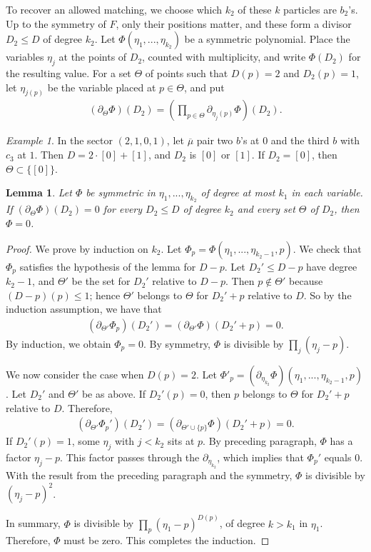 \documentclass[11pt]{amsart}
\newtheorem{lemma}[theorem]{Lemma}
\theoremstyle{definition}
\theoremstyle{remark}
\newtheorem{example}[theorem]{Example}
\begin{document}
To recover an allowed matching, we choose which $k_2$ of these $k$ particles are $b_2$'s. Up to the symmetry of $F$, only their positions matter, and these form a divisor $D_2\leq D$ of degree $k_2$. Let $\Phi(\eta_1,...,\eta_{k_2})$ be a symmetric polynomial. Place the variables $\eta_j$ at the points of $D_2$, counted with multiplicity, and write $\Phi(D_2)$ for the resulting value. For a set $\Theta$ of points such that $D(p)=2$ and $D_2(p)=1$, let $\eta_{j(p)}$ be the variable placed at $p\in \Theta$, and put
\begin{align*}
	(\partial_{\Theta}\Phi)(D_2)=\left(\prod_{p\in \Theta} \partial_{\eta_j(p)}\Phi\right)(D_2).	
\end{align*}
\begin{example}
	In the sector $(2,1,0,1)$, let $\overline{\mu}$ pair two $b$'s at 0 and the third $b$ with $c_3$ at $1$. Then $D=2\cdot [0]+[1]$, and $D_2$ is $[0]$ or $[1]$. If $D_2=[0]$, then $\Theta\subset\{[0] \} $.	
\end{example}
\begin{lemma}\label{lem:Phi}
	Let $\Phi$ be symmetric in $\eta_1,...,\eta_{k_2}$ of degree at most  $k_1$ in each variable. If $(\partial_{\Theta}\Phi)(D_2)=0$ for every $D_2\leq D$ of degree $k_2$ and every set $\Theta$ of $D_2$, then $\Phi=0$.
\end{lemma}
\begin{proof}
	We prove by induction on $k_2$. Let $\Phi_p=\Phi(\eta_1,...,\eta_{k_2-1},p)$. We check that $\Phi_p$ satisfies the hypothesis of the lemma for $D-p$. Let $D_2'\leq D-p$ have degree $k_2-1$, and $\Theta'$ be the set  for $D_2'$ relative to $D-p$. Then $p\notin \Theta'$ because $(D-p)(p)\leq 1$; hence $\Theta'$ belongs to $\Theta$ for $D_2'+p$ relative to $D$. So by the induction assumption, we have that
	\begin{align*}
		( \partial_{\Theta'} \Phi_p)(D_2')=(\partial_{\Theta'}\Phi)(D_2'+p)=0.
	\end{align*}
By induction, we obtain $\Phi_p=0$. By symmetry, $\Phi$ is divisible by $\prod_j(\eta_j-p)$. 

We now consider the case when $D(p)=2$. Let $\Phi'_p=(\partial_{\eta_{k_2}}\Phi)(\eta_1,...,\eta_{k_2-1},p)$. Let $D_2'$ and $\Theta'$ be as above. If $D_2'(p)=0$, then $p$ belongs to $\Theta$ for $D_2'+p$ relative to $D$. Therefore, 
\begin{align*}
	(\partial_{\Theta'}\Phi_p')(D_2')=(\partial_{\Theta'\cup\{p\}} \Phi)(D_2'+p)=0.
\end{align*} 
If $D_2'(p)=1$, some $\eta_j$ with $j<k_2$ sits at $p$. By preceding paragraph, $\Phi$ has a factor $\eta_j-p$. This factor passes through the $\partial_{\eta_{k_2}}$, which implies that $\Phi_p'$ equals $0$. With the result from the preceding paragraph and the symmetry, $\Phi$ is divisible by $(\eta_j-p)^2$.	

In summary, $\Phi$ is divisible by $\prod_{p}(\eta_1-p)^{D(p)}$, of degree $k>k_1$ in $\eta_1$. Therefore, $\Phi$ must be zero. This completes the induction. 	
\end{proof}
\end{document}
